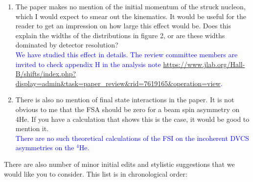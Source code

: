 \documentclass[a4paper,11pt,twoside]{article}
\begin{document}
\begin{enumerate}
\item  The paper makes no mention of the initial momentum of the struck 
   nucleon, which I would expect to smear out the kinematics. It would be 
      useful for the reader to get an impression on how large this effect would 
      be. Does this explain the widths of the distributions in figure 2, or are 
      these widths dominated by detector resolution?\\
   \textcolor{blue}{We have studied this effect in details. The review 
      committee members are invited to check appendix H in the analysis note 
      \url{ 
      https://www.jlab.org/Hall-B/shifts/index.php?display=admin&task=paper_review&rid=7619165&operation=view}.}

\item  There is also no mention of final state interactions in the paper. It is 
   not obvious to me that the FSA should be zero for a beam spin asymmetry on 
      4He. If you have a calculation that shows this is the case, it would be 
      good to mention it.\\
   \textcolor{blue}{There are no such theoretical calculations of the FSI on 
      the incoherent DVCS asymmetries on the $^4$He. }

\end{enumerate}


\newpage
\newpage
\newpage
\newpage

There are also number of minor initial edits and stylistic suggestions that we 
would like you to consider. This list is in chronological order:
\end{document}

